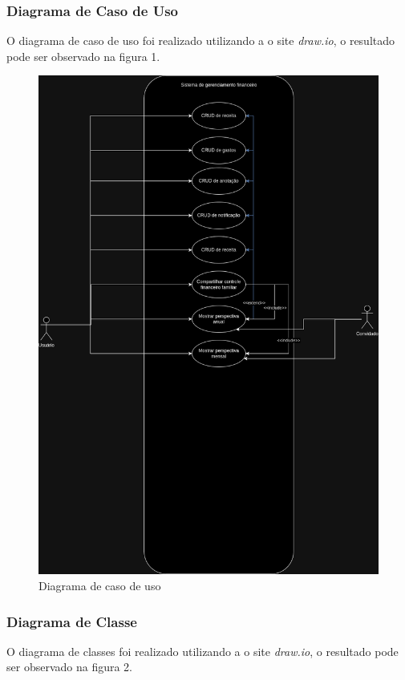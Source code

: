 \subsubsection{Diagrama de Caso de Uso}
O diagrama de caso de uso foi realizado utilizando a o site \textit{draw.io}, o resultado pode ser observado na figura 1. 
\begin{figure}[h!]
    \centering
    \caption{Diagrama de caso de uso}
    \includegraphics[scale=0.3]{images/money-tracker-Use-Case-Diagram.png}
\end{figure}

\subsubsection{Diagrama de Classe}
O diagrama de classes foi realizado utilizando a o site \textit{draw.io}, o resultado pode ser observado na figura 2. 

